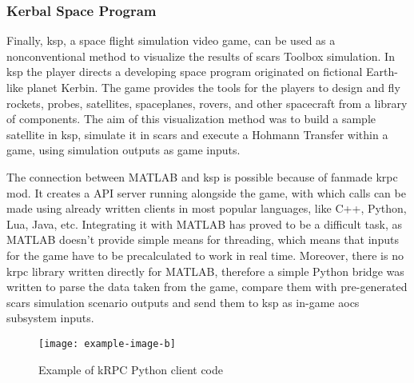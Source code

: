     \subsubsection{Kerbal Space Program}\label{sec:ksp}
        Finally, \ac{ksp}, a space flight simulation video game, can be used as a nonconventional method to visualize the results of \ac{scars} Toolbox simulation. In \ac{ksp} the player directs a developing space program originated on fictional Earth-like planet Kerbin. The game provides the tools for the players to design and fly rockets, probes, satellites, spaceplanes, rovers, and other spacecraft from a library of components.\cite{kerbals} The aim of this visualization method was to build a sample satellite in \ac{ksp}, simulate it in \ac{scars} and execute a Hohmann Transfer within a game, using simulation outputs as game inputs.

        The connection between MATLAB and \ac{ksp} is possible because of fanmade \ac{krpc} mod. It creates a API server running alongside the game, with which calls can be made using already written clients in most popular languages, like C++, Python, Lua, Java, etc. Integrating it with MATLAB has proved to be a difficult task, as MATLAB doesn't provide simple means for threading, which means that inputs for the game have to be precalculated to work in real time. Moreover, there is no \ac{krpc} library written directly for MATLAB, therefore a simple Python bridge was written to parse the data taken from the game, compare them with pre-generated \ac{scars} simulation scenario outputs and send them to \ac{ksp} as in-game \ac{aocs} subsystem inputs.

        \begin{figure}[H]
            \centering
            \texttt{[image: example-image-b]}
            \caption{Example of kRPC Python client code}
            \label{fig:krcp}
        \end{figure}